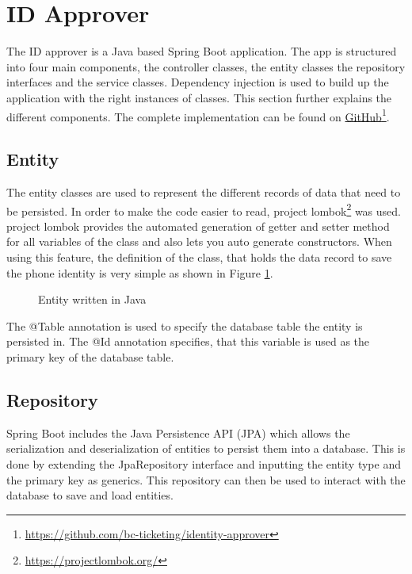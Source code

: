 \section{ID Approver}\label{imp:identity}
The ID approver is a Java based Spring Boot application. The app is structured into four main components, the controller classes, the entity classes the repository interfaces and the service classes. Dependency injection is used to build up the application with the right instances of classes.
This section further explains the different components. The complete implementation can be found on \href{https://github.com/bc-ticketing/identity-approver}{GitHub}\footnote{\href{https://github.com/bc-ticketing/identity-approver}{https://github.com/bc-ticketing/identity-approver}}.

\subsection{Entity}
The entity classes are used to represent the different records of data that need to be persisted. In order to make the code easier to read, project lombok\footnote{\href{https://projectlombok.org/}{https://projectlombok.org/}} was used. project lombok provides the automated generation of getter and setter method for all variables of the class and also lets you auto generate constructors. When using this feature, the definition of the class, that holds the data record to save the phone identity is very simple as shown in Figure \ref{code:entity}. 


\begin{figure}[H]
    
    \caption{Entity written in Java}
    \label{code:entity}
\end{figure}

The @Table annotation is used to specify the database table the entity is persisted in. The @Id annotation specifies, that this variable is used as the primary key of the database table.


\subsection{Repository}
Spring Boot includes the Java Persistence API (JPA) which allows the serialization and deserialization of entities to persist them into a database. This is done by extending the JpaRepository interface and inputting the entity type and the primary key as generics. This repository can then be used to interact with the database to save and load entities. 


